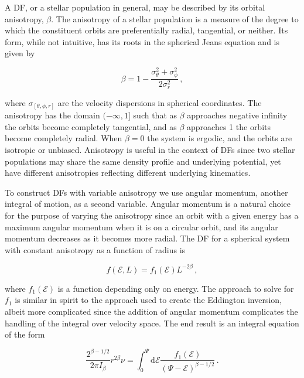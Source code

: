 A DF, or a stellar population in general, may be described by its orbital anisotropy, $\beta$. The anisotropy of a stellar population is a measure of the degree to which the constituent orbits are preferentially radial, tangential, or neither. Its form, while not intuitive, has its roots in the spherical Jeans equation and is given by 

\begin{equation}
    \label{ch1:eq:anisotropy}
    \beta = 1 - \frac{\sigma_{\theta}^{2} + \sigma_{\phi}^{2}}{2\sigma_{r}^{2}}\,,
\end{equation}

\noindent where $\sigma_{[\theta, \phi, r]}$ are the velocity dispersions in spherical coordinates. The anisotropy has the domain $(-\infty,1]$ such that as $\beta$ approaches negative infinity the orbits become completely tangential, and as $\beta$ approaches 1 the orbits become completely radial. When $\beta=0$ the system is ergodic, and the orbits are isotropic or unbiased. Anisotropy is useful in the context of DFs since two stellar populations may share the same density profile and underlying potential, yet have different anisotropies reflecting different underlying kinematics. 

To construct DFs with variable anisotropy we use angular momentum, another integral of motion, as a second variable. Angular momentum is a natural choice for the purpose of varying the anisotropy since an orbit with a given energy has a maximum angular momentum when it is on a circular orbit, and its angular momentum decreases as it becomes more radial. The DF for a spherical system with constant anisotropy as a function of radius is

\begin{equation}
    \label{ch1:eq:constant-anisotropy-df}
    f(\mathcal{E}, L) = f_{1}(\mathcal{E}) L^{-2\beta}\,,
\end{equation}

\noindent where $f_{1}(\mathcal{E})$ is a function depending only on energy. The approach to solve for $f_{1}$ is similar in spirit to the approach used to create the Eddington inversion, albeit more complicated since the addition of angular momentum complicates the handling of the integral over velocity space. The end result is an integral equation of the form

\begin{equation}
    \frac{ 2^{\beta-1/2} }{ 2\pi I_{\beta} } r^{2\beta}\nu = \int_{0}^{\Psi} \mathrm{d}\mathcal{E} \frac{ f_{1}(\mathcal{E}) }{ (\Psi-\mathcal{E})^{\beta-1/2} }\,.
\end{equation}
    
